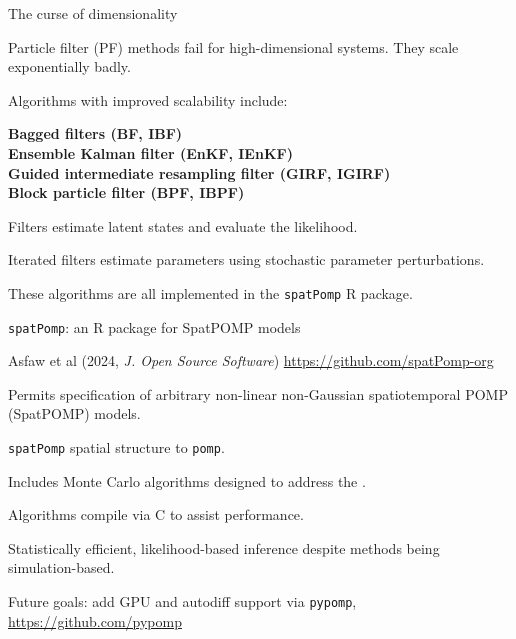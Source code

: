 \documentclass{beamer}
\begin{document}
\begin{frame}{The curse of dimensionality}

  \bi
  \item
    Particle filter (PF) methods fail for high-dimensional systems. They scale exponentially badly.

    \vspace{2mm}
    
  \item Algorithms with improved scalability include:\\

    \vspace{1mm}
    
  {\bf
  Bagged filters (BF, IBF)\\
  Ensemble Kalman filter (EnKF, IEnKF)\\
  Guided intermediate resampling filter (GIRF, IGIRF)\\
  Block particle filter (BPF, IBPF)\\
  }

      \vspace{2mm}

\item Filters estimate latent states and evaluate the likelihood.

    \vspace{2mm}

  \item Iterated filters estimate parameters using stochastic parameter perturbations.

        \vspace{2mm}

\item These algorithms are all implemented in the \texttt{spatPomp} R package.
  
  \ei
  
\end{frame}

\begin{frame}{\texttt{spatPomp}: an R package for SpatPOMP models}

  Asfaw et al (2024, {\it J. Open Source Software})
  \url{https://github.com/spatPomp-org}
  
  \bi
\item Permits specification of arbitrary non-linear non-Gaussian spatiotemporal POMP (SpatPOMP) models.
\item \texttt{spatPomp} spatial structure to \texttt{pomp}.
\item Includes Monte Carlo algorithms designed to address the .
  \item Algorithms compile via C to assist performance.
\item Statistically efficient, likelihood-based inference despite methods being simulation-based.
  \ei

  Future goals: add GPU and autodiff support via \texttt{pypomp}, \url{https://github.com/pypomp}
  
\end{frame}
\end{document}
